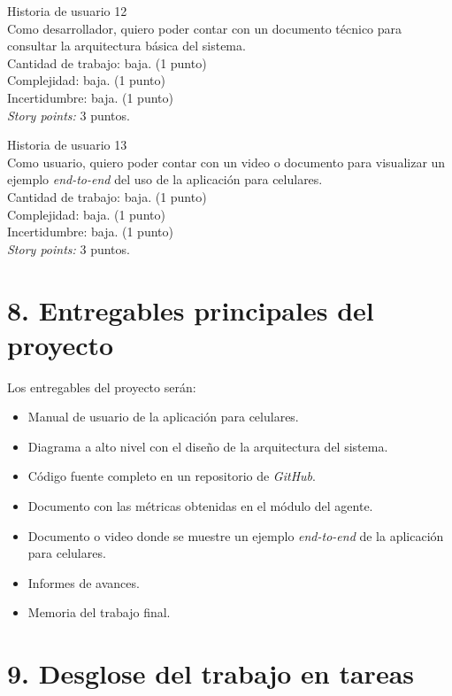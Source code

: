 \documentclass[
11pt, %
]{charter}
\begin{document}
Historia de usuario 12 \\
Como desarrollador, quiero poder contar con un documento técnico para consultar la arquitectura básica del sistema.\\
Cantidad de trabajo: baja. (1 punto)\\
Complejidad: baja. (1 punto)\\
Incertidumbre: baja. (1 punto)\\
\textit{Story points:} 3 puntos.

Historia de usuario 13 \\
Como usuario, quiero poder contar con un video o documento para visualizar un ejemplo \textit{end-to-end} del uso de la aplicación para celulares.\\
Cantidad de trabajo: baja. (1 punto)\\
Complejidad: baja. (1 punto)\\
Incertidumbre: baja. (1 punto)\\
\textit{Story points:} 3 puntos.


\section{8. Entregables principales del proyecto}
\label{sec:entregables}
Los entregables del proyecto serán:
\begin{itemize}
	\item Manual de usuario de la aplicación para celulares.
	\item Diagrama a alto nivel con el diseño de la arquitectura del sistema.
	\item Código fuente completo en un repositorio de \textit{GitHub}.
	\item Documento con las métricas obtenidas en el módulo del agente.
	\item Documento o video donde se muestre un ejemplo \textit{end-to-end} de la aplicación para celulares.
	\item Informes de avances.
	\item Memoria del trabajo final.
\end{itemize}


\section{9. Desglose del trabajo en tareas}
\label{sec:wbs}
\end{document}
